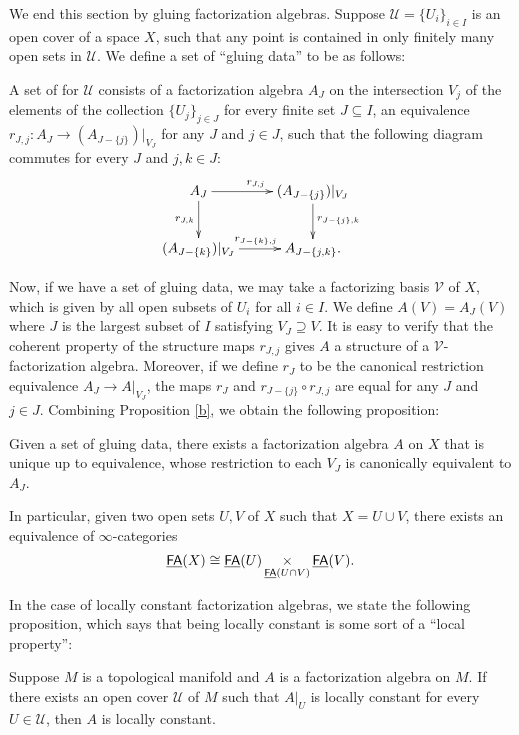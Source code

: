 \documentclass[twoside]{article}
\begin{document}
We end this section by gluing factorization algebras. Suppose 
$\mathscr U=\{U_i\}_{i\in I}$ is an open cover of a space $X$,
such that any point is contained in only finitely many open sets 
in $\mathscr U$. We define a set of ``gluing data'' to be as follows:

\begin{definition}
    A set of  for $\mathscr U$ consists of a factorization algebra $A_J$
    on the intersection $V_j$ of the elements of the collection $\{U_j\}_{j\in J}$ 
    for every finite set $J\subseteq I$, an equivalence $r_{J,j}:A_J
    \to(A_{J-\{j\}})|_{V_J}$ for any $J$ and $j\in J$, such that the following
    diagram commutes for every $J$ and $j,k\in J$: \[\xymatrix{
    A_J\ar[r]^{r_{J,j}}\ar[d]_{r_{J,k}}&(A_{J-\{j\}})|_{V_J}\ar[d]^{r_{J-\{j\},k}}\\
    (A_{J-\{k\}})|_{V_J}\ar[r]^{r_{J-\{k\},j}}&A_{J-\{j,k\}}.}\]
\end{definition}

Now, if we have a set of gluing data, we may take a factorizing basis $\mathscr V$ 
of $X$, which is given by all open subsets of $U_i$ for all $i\in I$. We define
$A(V)=A_J(V)$ where $J$ is the largest subset of $I$ satisfying 
$V_J\supseteq V$. It is easy to verify that the coherent property of the
structure maps $r_{J,j}$ gives $A$ a structure of a $\mathscr V$-factorization
algebra. Moreover, if we define $r_J$ to be the canonical restriction 
equivalence $A_J\to A|_{V_J}$, the maps $r_J$ and $r_{J-\{j\}}\circ r_{J,j}$
are equal for any $J$ and $j\in J$. Combining Proposition \ref{b}, we obtain
the following proposition:

\begin{proposition}\label{t}
    Given a set of gluing data, there exists a factorization algebra $A$ on $X$ that is unique up to equivalence,
    whose restriction to each $V_J$ is canonically equivalent to $A_J$.
\end{proposition}

In particular, given two open sets $U,V$ of $X$ such that $X=U\cup V$, there 
exists an equivalence of $\infty$-categories \[\underline{\smash{\mathsf{FA}}}(X)\cong\underline{\smash{\mathsf{FA}}}(U)
\mathop{\operatorname{\times}}\limits_{\underline{\smash{\mathsf{FA}}}(U\cap V)}\underline{\smash{\mathsf{FA}}}(V).\]

In the case of locally constant factorization algebras, we state the
following proposition, which says that being locally constant is some sort of a
``local property'':
\begin{proposition}\label{l}
    Suppose $M$ is a topological manifold and $A$ is a factorization algebra on $M$.
    If there exists an open cover $\mathscr U$ of $M$ such that $A|_U$ is
    locally constant for every $U\in\mathscr U$, then $A$ is locally constant.
\end{proposition}
\end{document}
